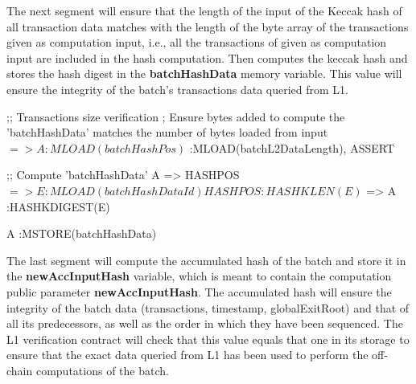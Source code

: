 
The next segment will ensure that the length of the input of the Keccak hash of all transaction data matches with the length of the byte array of the transactions given as computation input, i.e., all the transactions of given as computation input are included in the hash computation. Then computes the keccak hash and stores the hash digest in the \textbf{batchHashData} memory variable. This value will ensure the integrity of the batch's transactions data queried from L1.

\begin{zkasm}
    ;; Transactions size verification
    ; Ensure bytes added to compute the 'batchHashData' matches the number of bytes loaded from input
    $ => A                          :MLOAD(batchHashPos)
    $                               :MLOAD(batchL2DataLength), ASSERT
    
    ;; Compute 'batchHashData'
    A => HASHPOS
    $ => E                          :MLOAD(batchHashDataId)
    
    HASHPOS                         :HASHKLEN(E)
    $ => A                          :HASHKDIGEST(E)
    
    A                               :MSTORE(batchHashData)
\end{zkasm}

The last segment will compute the accumulated hash of the batch and store it in the \textbf{newAccInputHash} variable, which is meant to contain the computation public parameter \textbf{newAccInputHash}. The accumulated hash will ensure the integrity of the batch data (transactions, timestamp, globalExitRoot) and that of all its predecessors, as well as the order in which they have been sequenced. The L1 verification contract will check that this value equals that one in its storage to ensure that the exact data queried from L1 has been used to perform the off-chain computations of the batch.

